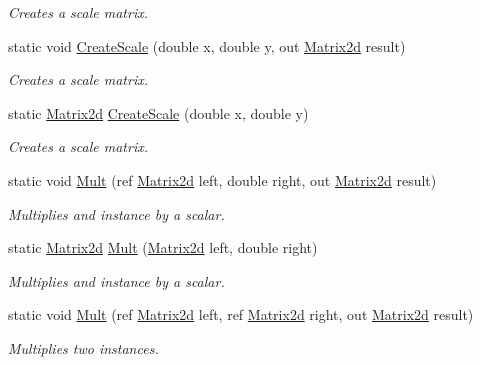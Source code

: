 \begin{DoxyCompactItemize}
\begin{DoxyCompactList}\small\item\em Creates a scale matrix. \end{DoxyCompactList}\item 
static void \hyperlink{struct_open_t_k_1_1_matrix2d_aee5a12dc0684e0ac44fd9eb703e95433}{Create\-Scale} (double x, double y, out \hyperlink{struct_open_t_k_1_1_matrix2d}{Matrix2d} result)
\begin{DoxyCompactList}\small\item\em Creates a scale matrix. \end{DoxyCompactList}\item 
static \hyperlink{struct_open_t_k_1_1_matrix2d}{Matrix2d} \hyperlink{struct_open_t_k_1_1_matrix2d_a4adb188719fff46a761af68c4f854802}{Create\-Scale} (double x, double y)
\begin{DoxyCompactList}\small\item\em Creates a scale matrix. \end{DoxyCompactList}\item 
static void \hyperlink{struct_open_t_k_1_1_matrix2d_aa63880c886afa4afd1156adb219d923e}{Mult} (ref \hyperlink{struct_open_t_k_1_1_matrix2d}{Matrix2d} left, double right, out \hyperlink{struct_open_t_k_1_1_matrix2d}{Matrix2d} result)
\begin{DoxyCompactList}\small\item\em Multiplies and instance by a scalar. \end{DoxyCompactList}\item 
static \hyperlink{struct_open_t_k_1_1_matrix2d}{Matrix2d} \hyperlink{struct_open_t_k_1_1_matrix2d_a7f84d3bea783cad818929bdd781cc972}{Mult} (\hyperlink{struct_open_t_k_1_1_matrix2d}{Matrix2d} left, double right)
\begin{DoxyCompactList}\small\item\em Multiplies and instance by a scalar. \end{DoxyCompactList}\item 
static void \hyperlink{struct_open_t_k_1_1_matrix2d_a5622fd6bb05db2cb529d0557615307d7}{Mult} (ref \hyperlink{struct_open_t_k_1_1_matrix2d}{Matrix2d} left, ref \hyperlink{struct_open_t_k_1_1_matrix2d}{Matrix2d} right, out \hyperlink{struct_open_t_k_1_1_matrix2d}{Matrix2d} result)
\begin{DoxyCompactList}\small\item\em Multiplies two instances. \end{DoxyCompactList}\item 

\end{DoxyCompactItemize}
